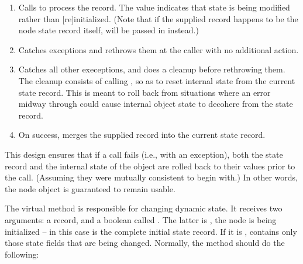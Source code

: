 \documentclass[10pt]{article}
\begin{document}
\begin{enumerate}

  \item Calls  to process the record. The
     value indicates that state is being modified rather than
    [re]initialized. (Note that if the supplied record happens to be the node
    state record itself,  will be passed in instead.)

  \item Catches  exceptions and rethrows them at
    the caller with no additional action.

  \item Catches all other execeptions, and does a cleanup before rethrowing
    them. The cleanup consists of calling , so
    as to reset internal state from the current state record. This is meant to
    roll back from situations where an error midway through 
    could cause internal object state to decohere from the state record.

  \item On success, merges the supplied record into the current state record.

\end{enumerate}

  This design ensures that if a  call fails (i.e., with an
  exception), both the state record and the internal state of the object are
  rolled back to their values prior to the call. (Assuming they were mutually
  consistent to begin with.) In other words, the node object is guaranteed to
  remain usable.

  The virtual  method is responsible for changing dynamic
  state. It receives two arguments: a  record, and a boolean called
  . The latter is , the node is being initialized --
  in this case  is the complete initial state record. If it is
  ,  contains only those state fields that are being
  changed. Normally, the method should do the following:
\end{document}
